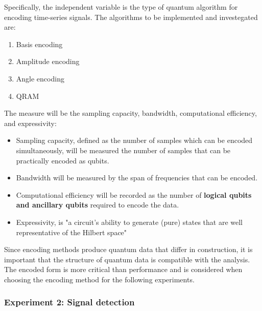 Specifically, the independent variable is the type of quantum algorithm for encoding time-series signals.
The algorithms to be implemented and investegated are:
\begin{enumerate}
    \item Basis encoding
    \item Amplitude encoding
    \item Angle encoding
    \item \ac{QRAM}
\end{enumerate}

The measure will be the sampling capacity, bandwidth, computational efficiency, and expressivity:
\begin{itemize}
    \item Sampling capacity, defined as the number of samples which can be encoded simultaneously, will be measured the number of samples that can be practically encoded as qubits.
    \item Bandwidth will be measured by the span of frequencies that can be encoded.
    \item Computational efficiency will be recorded as the number of \textbf{logical qubits and ancillary qubits} required to encode the data.
    \item Expressivity, is "a circuit’s ability to generate (pure) states that are well representative of the Hilbert space" \cite{sim_expressibility_2019} 
\end{itemize}
Since encoding methods produce quantum data that differ in construction, it is important that the structure of quantum data is compatible with the analysis.
The encoded form is more critical than performance and is considered when choosing the encoding method for the following experiments.


\subsubsection{Experiment 2: Signal detection}


